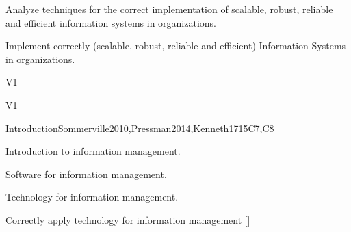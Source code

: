 \begin{syllabus}


\begin{justification}
Analyze techniques for the correct implementation of scalable, robust, reliable and efficient information systems in organizations.
\end{justification}

\begin{goals}
\item Implement correctly (scalable, robust, reliable and efficient) Information Systems in organizations.
\end{goals}

\begin{outcomes}{V1}
    \item {}
    \item {}
    \item {}
\end{outcomes}

\begin{competences}{V1}
    \item {} 
    \item {} 
    \item {} 
    \item {} 
    \item {} 
    \item {} 
\end{competences}

\begin{unit}{Introduction}{}{Sommerville2010,Pressman2014,Kenneth17}{15}{C7,C8}
\begin{topics}
    \item Introduction to information management.
    \item Software for information management.
    \item Technology for information management.
\end{topics}
\begin{learningoutcomes}
    \item Correctly apply technology for information management [\Assessment]
\end{learningoutcomes}
\end{unit}


\end{syllabus}
